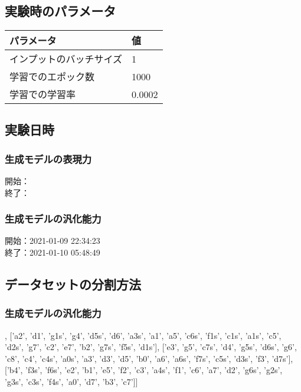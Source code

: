 \appendix
\chapter{}
\label{sec:appendix}

\section{実験時のパラメータ}

\begin{table}[h]
\begin{center}
    \begin{tabular}{|l||l|}\hline
        パラメータ & 値 \\ \hline \hline
        インプットのバッチサイズ & 1 \\ \hline
        学習でのエポック数 & 1000 \\ \hline
        学習での学習率 & 0.0002 \\ \hline
    \end{tabular}
\end{center}
\end{table}

\section{実験日時}

\subsection{生成モデルの表現力}

\noindent
開始：\\
終了：

\subsection{生成モデルの汎化能力}

\noindent
開始：2021-01-09 22:34:23\\
終了：2021-01-10 05:48:49

\section{データセットの分割方法}

\subsection{生成モデルの汎化能力}

\noindent
[['a5s', 'g2', 'e6', 'f6', 'g3', 'c1', 'a2s', 'f7', 'f5', 'c2s', 'b5', 'e4', 'b6', 'd4s', 'a4', 'b7', 'e1', 'g4s', 'f4', 'a7s', 'g1', 'f2s'], ['a2', 'd1', 'g1s', 'g4', 'd5s', 'd6', 'a3s', 'a1', 'a5', 'c6s', 'f1s', 'c1s', 'a1s', 'c5', 'd2s', 'g7', 'c2', 'e7', 'b2', 'g7s', 'f5s', 'd1s'], ['e3', 'g5', 'c7s', 'd4', 'g5s', 'd6s', 'g6', 'c8', 'c4', 'c4s', 'a0s', 'a3', 'd3', 'd5', 'b0', 'a6', 'a6s', 'f7s', 'c5s', 'd3s', 'f3', 'd7s'], ['b4', 'f3s', 'f6s', 'e2', 'b1', 'e5', 'f2', 'c3', 'a4s', 'f1', 'c6', 'a7', 'd2', 'g6s', 'g2s', 'g3s', 'c3s', 'f4s', 'a0', 'd7', 'b3', 'c7']]
